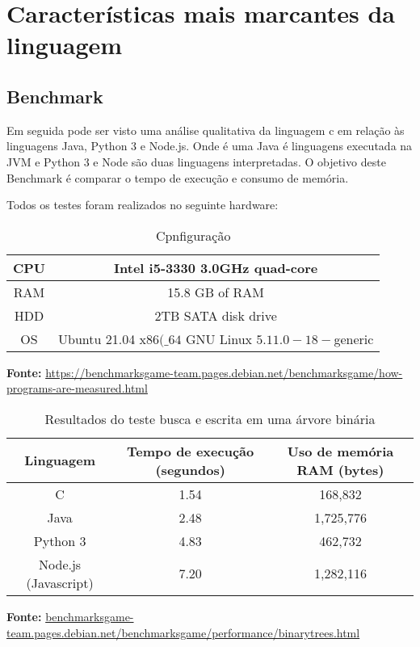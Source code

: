 \chapter{Características mais marcantes da linguagem}


\section{Benchmark}

Em seguida pode ser visto uma análise qualitativa da linguagem c
 em relação às linguagens Java, Python 3  e Node.js. Onde é uma Java é linguagens executada na JVM 
 e Python 3 e Node são duas linguagens interpretadas. 
 O objetivo deste Benchmark é comparar o tempo de execução e consumo de memória. 


Todos os testes foram realizados no seguinte hardware:

\begin{table}[ht]
    \centering
    \caption{Cpnfiguração}
    \begin{tabular}{| c | c |}
        \hline 
        CPU & Intel i5-3330 3.0GHz quad-core\\
        \hline
        RAM & 15.8 GB of RAM \\
        \hline 
        HDD & 2TB SATA disk drive \\
        \hline
        OS & Ubuntu 21.04 x\(86(\_64\) GNU Linux \(5.11.0-18-\)generic \\
        \hline   
    \end{tabular}
\end{table}
\textbf{Fonte:} \url{https://benchmarksgame-team.pages.debian.net/benchmarksgame/how-programs-are-measured.html}






\begin{table}[ht]
    \centering
    \caption{Resultados do teste busca e escrita em uma árvore binária}
    \begin{tabular}{| c | c | c |}
        \hline 
        Linguagem & Tempo de execução (segundos)
        & Uso de memória RAM (bytes) \\
        \hline
        C & 1.54 & 168,832 \\
        \hline 
        Java & 2.48 & 1,725,776 \\
        \hline
        Python 3 & 4.83 & 462,732 \\
        \hline
        Node.js (Javascript) & 7.20 & 1,282,116\\ 
        \hline
        
    \end{tabular}
\end{table}
\textbf{Fonte:} \url{benchmarksgame-team.pages.debian.net/benchmarksgame/performance/binarytrees.html}


